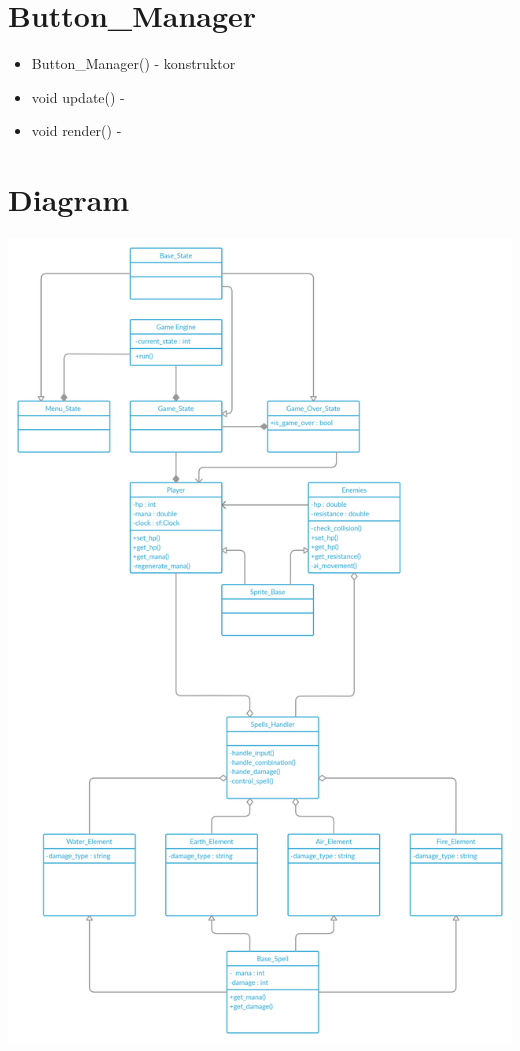 \documentclass{TDP005mall}
\begin{document}
\section{Button\_Manager}

\begin{itemize}
  
\item Button\_Manager() - konstruktor
\item void update() - 
\item void render() - 
  
\end{itemize}





\section{Diagram}
\begin{center}
  \includegraphics[scale=0.18]{uml_diagram.jpg}
\end{center}
\end{document}
